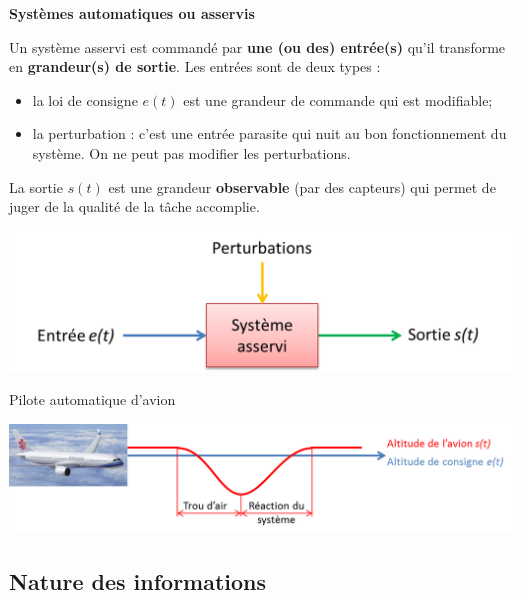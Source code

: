\documentclass[10pt,fleqn]{article} %
\begin{document}
\begin{defi}
\textbf{Systèmes automatiques ou asservis}

Un système asservi est commandé par \textbf{une (ou des) entrée(s)} qu'il
transforme en \textbf{grandeur(s) de sortie}.
Les entrées sont de deux types : 
\begin{itemize}
 \item la loi de consigne $e(t)$ est une grandeur de commande qui est
modifiable;
\item la perturbation : c'est une entrée parasite qui nuit au bon
fonctionnement du système. On ne peut pas modifier les perturbations.
\end{itemize}

La sortie $s(t)$ est une grandeur \textbf{observable} (par des capteurs) qui
permet de juger de la qualité de la tâche accomplie.
\end{defi} 

 \begin{center}
    \includegraphics[width=.6\textwidth]{images/asservi}
  \end{center}
	

\begin{exemple}
Pilote automatique d'avion

 \begin{center}
    \includegraphics[width=.8\textwidth]{images/piloteauto}
  \end{center}
\end{exemple}



\subsection{Nature des informations}
\end{document}
